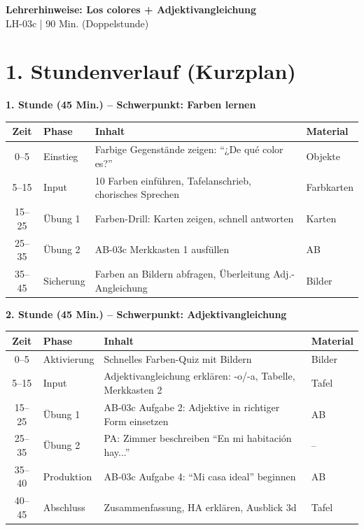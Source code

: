 \documentclass[11pt, a4paper]{article}
\newcommand{\fachfarbe}{spanisch}
\newcommand{\thema}{Los colores + Adjektivangleichung}
\newcommand{\sequenz}{03}
\newcommand{\block}{c}
\newcommand{\dauer}{90 Min. (Doppelstunde)}
\begin{document}
\begin{center}
    {\Large\bfseries\textcolor{\fachfarbe}{Lehrerhinweise: \thema}}\\[0.3em]
    {\normalsize LH-\sequenz\block{} | \dauer}
\end{center}

\vspace{10pt}


\section*{1. Stundenverlauf (Kurzplan)}

\textbf{1. Stunde (45 Min.) -- Schwerpunkt: Farben lernen}

\begin{tabularx}{\textwidth}{|c|l|X|l|}
\hline
\textbf{Zeit} & \textbf{Phase} & \textbf{Inhalt} & \textbf{Material} \\
\hline
0--5 & Einstieg & Farbige Gegenstände zeigen: ``¿De qué color es?'' & Objekte \\
\hline
5--15 & Input & 10 Farben einführen, Tafelanschrieb, chorisches Sprechen & Farbkarten \\
\hline
15--25 & Übung 1 & Farben-Drill: Karten zeigen, schnell antworten & Karten \\
\hline
25--35 & Übung 2 & AB-03c Merkkasten 1 ausfüllen & AB \\
\hline
35--45 & Sicherung & Farben an Bildern abfragen, Überleitung Adj.-Angleichung & Bilder \\
\hline
\end{tabularx}

\vspace{1em}

\textbf{2. Stunde (45 Min.) -- Schwerpunkt: Adjektivangleichung}

\begin{tabularx}{\textwidth}{|c|l|X|l|}
\hline
\textbf{Zeit} & \textbf{Phase} & \textbf{Inhalt} & \textbf{Material} \\
\hline
0--5 & Aktivierung & Schnelles Farben-Quiz mit Bildern & Bilder \\
\hline
5--15 & Input & Adjektivangleichung erklären: -o/-a, Tabelle, Merkkasten 2 & Tafel \\
\hline
15--25 & Übung 1 & AB-03c Aufgabe 2: Adjektive in richtiger Form einsetzen & AB \\
\hline
25--35 & Übung 2 & PA: Zimmer beschreiben ``En mi habitación hay...'' & -- \\
\hline
35--40 & Produktion & AB-03c Aufgabe 4: ``Mi casa ideal'' beginnen & AB \\
\hline
40--45 & Abschluss & Zusammenfassung, HA erklären, Ausblick 3d & Tafel \\
\hline
\end{tabularx}
\end{document}
